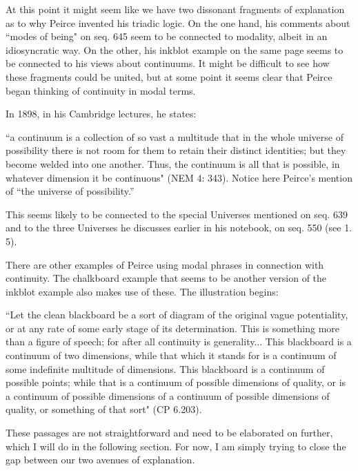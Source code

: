 \documentclass[12pt]{article}
\begin{document}
At this point it might seem like we have two dissonant fragments of explanation as to why Peirce invented his triadic logic. On the one hand, his comments about ``modes of being" on seq. 645 seem to be connected to modality, albeit in an idiosyncratic way. On the other, his inkblot example on the same page seems to be connected to his views about continuums. It might be difficult to see how these fragments could be united, but at some point it seems clear that Peirce began thinking of continuity in modal terms.

In 1898, in his Cambridge lectures, he states:
\begin{singlespace}
``a continuum is a collection of so vast a multitude that in the whole universe of possibility there is not room for them to retain their distinct identities; but they become welded into one another. Thus, the continuum is all that is possible, in whatever dimension it be continuous" (NEM 4: 343). Notice here Peirce's mention of ``the universe of possibility.''
\end{singlespace}
\noindent This seems likely to be connected to the special Universes mentioned on seq. 639 and to the three Universes he discusses earlier in his notebook, on seq. 550 (see 1. 5).

There are other examples of Peirce using modal phrases in connection with continuity. The chalkboard example that seems to be another version of the inkblot example also makes use of these. The illustration begins:
\begin{singlespace}
 ``Let the clean blackboard be a sort of diagram of the original vague potentiality, or at any rate of some early stage of its determination. This is something more than a figure of speech; for after all continuity is generality... This blackboard is a continuum of two dimensions, while that which it stands for is a continuum of some indefinite multitude of dimensions. This blackboard is a continuum of possible points; while that is a continuum of possible dimensions of quality, or is a continuum of possible dimensions of a continuum of possible dimensions of quality, or something of that sort" (CP 6.203).
\end{singlespace}
\noindent These passages are not straightforward and need to be elaborated on further, which I will do in the following section. For now, I am simply trying to close the gap between our two avenues of explanation.
\end{document}
